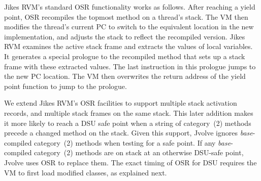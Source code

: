 \documentclass[9pt]{sigplanconf}
\newcommand{\DSU}{{\sc Jvolve}}
\newcommand{\JikesRVM}{Jikes RVM}
\begin{document}
\JikesRVM{}'s standard OSR functionality works as follows.
After reaching a yield point, OSR recompiles the 
topmost method on a thread's stack.  %
The VM then modifies the thread's current PC to switch to
the equivalent location in the new implementation, and adjusts the
stack to reflect the recompiled version.  \JikesRVM{}
examines the active stack frame and extracts the values of local
variables. It generates a special prologue to the recompiled method
that sets up a stack frame with these extracted values. The last instruction
in this prologue jumps to the new PC location. The VM then overwrites the
return address of the yield point function to jump to the prologue.

We  extend \JikesRVM's OSR facilities to support multiple stack
activation records, and multiple stack frames on the same stack. This later addition makes it more likely to reach a DSU safe point when a string of category~(2) methods precede a changed
method on the stack.
Given this support, \DSU{} ignores \emph{base}-compiled category~(2) methods
when testing for a safe point.  If any \emph{base}-compiled category~(2)
methods are on stack at an otherwise DSU-safe point, \DSU{} uses OSR
to replace them.  The exact timing of OSR for DSU requires the VM to
first load modified classes, as explained next.


\end{document}
